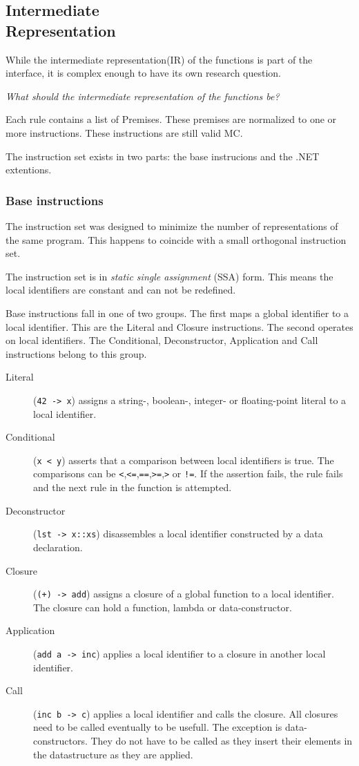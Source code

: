 \subsection[Intermediate Representation]{Intermediate\\Representation}
While the intermediate representation(IR) of the functions is part of the interface, it is complex enough to have its own research question.

\textit{What should the intermediate representation of the functions be?}

Each rule contains a list of Premises.
These premises are normalized to one or more instructions.
These instructions are still valid MC.

The instruction set exists in two parts: the base instrucions and the .NET extentions.

\subsubsection{Base instructions}
The instruction set was designed to minimize the number of representations of the same program.
This happens to coincide with a small orthogonal instruction set.

The instruction set is in \textit{static single assignment} (SSA) form.
This means the local identifiers are constant and can not be redefined.

Base instructions fall in one of two groups.
The first maps a global identifier to a local identifier.
This are the Literal and Closure instructions.
The second operates on local identifiers.
The Conditional, Deconstructor, Application and Call instructions belong to this group.

\begin{description}
\item[Literal] (\verb|42 -> x|) assigns a string-, boolean-, integer- or floating-point literal to a local identifier.
\item[Conditional] (\verb|x < y|) asserts that a comparison between local identifiers is true.
    The comparisons can be \verb|<|,\verb|<=|,\verb|==|,\verb|>=|,\verb|>| or \verb|!=|.
    If the assertion fails, the rule fails and the next rule in the function is attempted.
\item[Deconstructor] (\verb|lst -> x::xs|) disassembles a local identifier constructed by a data declaration.
\item[Closure] (\verb|(+) -> add|) assigns a closure of a global function to a local identifier.
    The closure can hold a function, lambda or data-constructor.
\item[Application] (\verb|add a -> inc|) applies a local identifier to a closure in another local identifier.
\item[Call] (\verb|inc b -> c|) applies a local identifier and calls the closure.
    All closures need to be called eventually to be usefull.
    The exception is data-constructors. 
    They do not have to be called as they insert their elements in the datastructure as they are applied.
\end{description}

